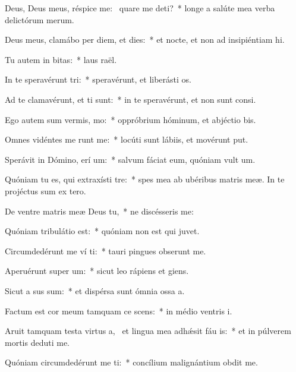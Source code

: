 \item Deus, Deus meus, réspice  me:~\pscross{} quare me deti?~* longe a salúte mea verba delictórum merum.
\item Deus meus, clamábo per diem, et  dies:~* et nocte, et non ad insipiéntiam hi.
\item Tu autem in  bitas:~* laus raël.
\item In te speravérunt  tri:~* speravérunt, et liberásti os.
\item Ad te clamavérunt, et  ti sunt:~* in te speravérunt, et non sunt consi.
\item Ego autem sum vermis,   mo:~* oppróbrium hóminum, et abjéctio bis.
\item Omnes vidéntes me runt me:~* locúti sunt lábiis, et movérunt put.
\item Sperávit in Dómino, erí um:~* salvum fáciat eum, quóniam vult um.
\item Quóniam tu es, qui extraxísti   tre:~* spes mea ab ubéribus matris meæ. In te projéctus sum ex tero.
\item De ventre matris meæ Deus   tu,~* ne discésseris  me:
\item Quóniam tribulátio  est:~* quóniam non est qui juvet.
\item Circumdedérunt me ví ti:~* tauri pingues obserunt me.
\item Aperuérunt super   um:~* sicut leo rápiens et giens.
\item Sicut a sus sum:~* et dispérsa sunt ómnia ossa a.
\item Factum est cor meum tamquam ce scens:~* in médio ventris i.
\item Aruit tamquam testa virtus a,~\pscross{} et lingua mea adhǽsit fáu is:~* et in púlverem mortis deduti me.
\item Quóniam circumdedérunt me  ti:~* concílium malignántium obdit me.
